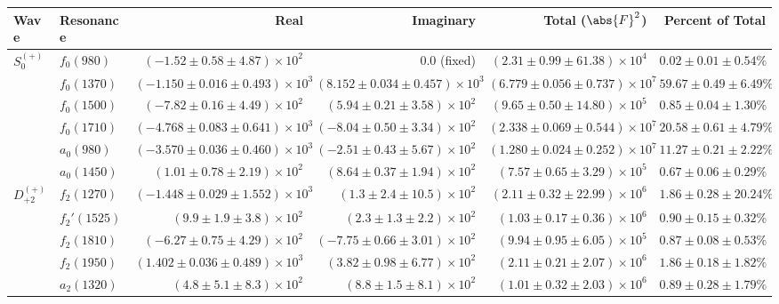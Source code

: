 \begin{table}[ht]
    \begin{center}
        \begin{tabular}{llrrrr}\toprule
        Wave & Resonance & Real & Imaginary & Total ($\abs{F}^2$) & Percent of Total \\\midrule
$S_{0}^{(+)}$ & $f_{0}(980)$ & $(-1.52 \pm 0.58 \pm 4.87) \times 10^{2}$ & $0.0$ (fixed) & $(2.31 \pm 0.99 \pm 61.38) \times 10^{4}$ & $0.02 \pm 0.01 \pm 0.54 \%$ \\
 & $f_{0}(1370)$ & $(-1.150 \pm 0.016 \pm 0.493) \times 10^{3}$ & $(8.152 \pm 0.034 \pm 0.457) \times 10^{3}$ & $(6.779 \pm 0.056 \pm 0.737) \times 10^{7}$ & $59.67 \pm 0.49 \pm 6.49 \%$ \\
 & $f_{0}(1500)$ & $(-7.82 \pm 0.16 \pm 4.49) \times 10^{2}$ & $(5.94 \pm 0.21 \pm 3.58) \times 10^{2}$ & $(9.65 \pm 0.50 \pm 14.80) \times 10^{5}$ & $0.85 \pm 0.04 \pm 1.30 \%$ \\
 & $f_{0}(1710)$ & $(-4.768 \pm 0.083 \pm 0.641) \times 10^{3}$ & $(-8.04 \pm 0.50 \pm 3.34) \times 10^{2}$ & $(2.338 \pm 0.069 \pm 0.544) \times 10^{7}$ & $20.58 \pm 0.61 \pm 4.79 \%$ \\
 & $a_{0}(980)$ & $(-3.570 \pm 0.036 \pm 0.460) \times 10^{3}$ & $(-2.51 \pm 0.43 \pm 5.67) \times 10^{2}$ & $(1.280 \pm 0.024 \pm 0.252) \times 10^{7}$ & $11.27 \pm 0.21 \pm 2.22 \%$ \\
 & $a_{0}(1450)$ & $(1.01 \pm 0.78 \pm 2.19) \times 10^{2}$ & $(8.64 \pm 0.37 \pm 1.94) \times 10^{2}$ & $(7.57 \pm 0.65 \pm 3.29) \times 10^{5}$ & $0.67 \pm 0.06 \pm 0.29 \%$ \\
$D_{+2}^{(+)}$ & $f_{2}(1270)$ & $(-1.448 \pm 0.029 \pm 1.552) \times 10^{3}$ & $(1.3 \pm 2.4 \pm 10.5) \times 10^{2}$ & $(2.11 \pm 0.32 \pm 22.99) \times 10^{6}$ & $1.86 \pm 0.28 \pm 20.24 \%$ \\
 & $f_{2}'(1525)$ & $(9.9 \pm 1.9 \pm 3.8) \times 10^{2}$ & $(2.3 \pm 1.3 \pm 2.2) \times 10^{2}$ & $(1.03 \pm 0.17 \pm 0.36) \times 10^{6}$ & $0.90 \pm 0.15 \pm 0.32 \%$ \\
 & $f_{2}(1810)$ & $(-6.27 \pm 0.75 \pm 4.29) \times 10^{2}$ & $(-7.75 \pm 0.66 \pm 3.01) \times 10^{2}$ & $(9.94 \pm 0.95 \pm 6.05) \times 10^{5}$ & $0.87 \pm 0.08 \pm 0.53 \%$ \\
 & $f_{2}(1950)$ & $(1.402 \pm 0.036 \pm 0.489) \times 10^{3}$ & $(3.82 \pm 0.98 \pm 6.77) \times 10^{2}$ & $(2.11 \pm 0.21 \pm 2.07) \times 10^{6}$ & $1.86 \pm 0.18 \pm 1.82 \%$ \\
 & $a_{2}(1320)$ & $(4.8 \pm 5.1 \pm 8.3) \times 10^{2}$ & $(8.8 \pm 1.5 \pm 8.1) \times 10^{2}$ & $(1.01 \pm 0.32 \pm 2.03) \times 10^{6}$ & $0.89 \pm 0.28 \pm 1.79 \%$ \\

\end{tabular}
\end{center}
\end{table}
